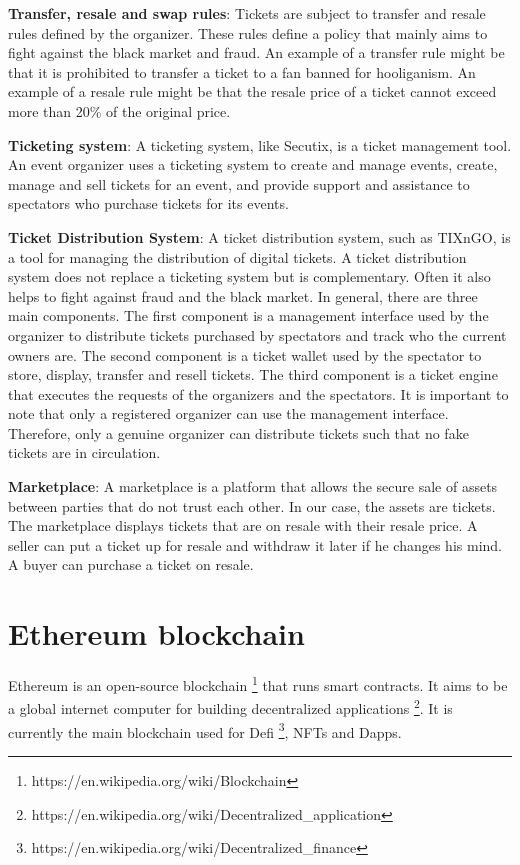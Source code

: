 \documentclass[a4paper,11pt,oneside]{report}
\begin{document}
\begin{description}
    \item \textbf{Transfer, resale and swap rules}: Tickets are subject to transfer and resale rules defined by the organizer. These rules define a policy that mainly aims to fight against the black market and fraud. An example of a transfer rule might be that it is prohibited to transfer a ticket to a fan banned for hooliganism. An example of a resale rule might be that the resale price of a ticket cannot exceed more than 20\% of the original price.
    \item \textbf{Ticketing system}: A ticketing system, like Secutix, is a ticket management tool. An event organizer uses a ticketing system to create and manage events, create, manage and sell tickets for an event, and provide support and assistance to spectators who purchase tickets for its events.
    \item \textbf{Ticket Distribution System}: A ticket distribution system, such as TIXnGO, is a tool for managing the distribution of digital tickets. A ticket distribution system does not replace a ticketing system but is complementary. Often it also helps to fight against fraud and the black market. In general, there are three main components. The first component is a management interface used by the organizer to distribute tickets purchased by spectators and track who the current owners are. The second component is a ticket wallet used by the spectator to store, display, transfer and resell tickets. The third component is a ticket engine that executes the requests of the organizers and the spectators. It is important to note that only a registered organizer can use the management interface. Therefore, only a genuine organizer can distribute tickets such that no fake tickets are in circulation.
    \item \textbf{Marketplace}: A marketplace is a platform that allows the secure sale of assets between parties that do not trust each other. In our case, the assets are tickets. The marketplace displays tickets that are on resale with their resale price. A seller can put a ticket up for resale and withdraw it later if he changes his mind. A buyer can purchase a ticket on resale.
\end{description}

\section{Ethereum blockchain}
Ethereum is an open-source blockchain \footnote{https://en.wikipedia.org/wiki/Blockchain} that runs smart contracts. It aims to be a global internet computer for building decentralized applications \footnote{https://en.wikipedia.org/wiki/Decentralized\_application}. It is currently the main blockchain used for Defi \footnote{https://en.wikipedia.org/wiki/Decentralized\_finance}, NFTs and Dapps.
\end{document}
